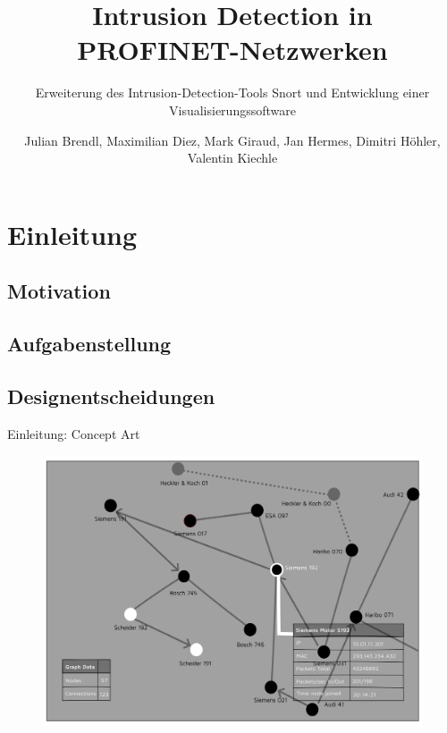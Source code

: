 \documentclass[18pt]{beamer}
\title[Intrusion Detection in PROFINET-Netzwerken]{Intrusion Detection in PROFINET-Netzwerken}
\subtitle{Erweiterung des Intrusion-Detection-Tools Snort und Entwicklung einer Visualisierungssoftware}
\author{Julian Brendl, Maximilian Diez, Mark Giraud, Jan Hermes, Dimitri Höhler, Valentin Kiechle}
\institute{Fraunhofer IOSB: Gruppe für sichere vernetzte Systeme}
\begin{document}

\begin{frame}
\titlepage
\end{frame}


\tableofcontents


\section{Einleitung}
\subsection{Motivation}
    
\subsection{Aufgabenstellung}
    
\subsection{Designentscheidungen}
    

\begin{frame}{Einleitung: Concept Art}
	\begin{figure}
		\includegraphics[height=0.95\textheight]{./images/GUI.png}
	\end{figure}
\end{frame}
\end{document}
